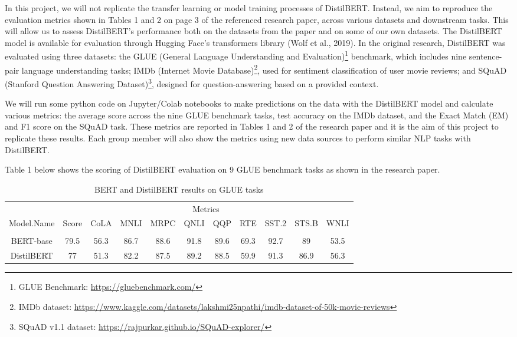 \documentclass[
  11pt,
]{article}
\begin{document}
In this project, we will not replicate the transfer learning or model
training processes of DistilBERT. Instead, we aim to reproduce the
evaluation metrics shown in Tables 1 and 2 on page 3 of the referenced
research paper, across various datasets and downstream tasks. This will
allow us to assess DistilBERT's performance both on the datasets from
the paper and on some of our own datasets. The DistilBERT model is
available for evaluation through Hugging Face's transformers library
(Wolf et al., 2019). In the original research, DistilBERT was evaluated
using three datasets: the GLUE (General Language Understanding and
Evaluation)\footnote{GLUE Benchmark: \url{https://gluebenchmark.com/}}
benchmark, which includes nine sentence-pair language understanding
tasks; IMDb (Internet Movie Database)\footnote{IMDb dataset:
  \url{https://www.kaggle.com/datasets/lakshmi25npathi/imdb-dataset-of-50k-movie-reviews}},
used for sentiment classification of user movie reviews; and SQuAD
(Stanford Question Answering Dataset)\footnote{SQuAD v1.1 dataset:
  \url{https://rajpurkar.github.io/SQuAD-explorer/}}, designed for
question-answering based on a provided context.

We will run some python code on Jupyter/Colab notebooks to make
predictions on the data with the DistilBERT model and calculate various
metrics: the average score across the nine GLUE benchmark tasks, test
accuracy on the IMDb dataset, and the Exact Match (EM) and F1 score on
the SQuAD task. These metrics are reported in Tables 1 and 2 of the
research paper and it is the aim of this project to replicate these
results. Each group member will also show the metrics using new data
sources to perform similar NLP tasks with DistilBERT.

Table 1 below shows the scoring of DistilBERT evaluation on 9 GLUE
benchmark tasks as shown in the research paper.

\begin{longtable}[t]{ccccccccccc}
\caption{\label{tab:table1}BERT and DistilBERT results on GLUE tasks}\\
\toprule
\multicolumn{1}{c}{ } & \multicolumn{10}{c}{Metrics} \\
\cmidrule(l{3pt}r{3pt}){2-11}
Model.Name & Score & CoLA & MNLI & MRPC & QNLI & QQP & RTE & SST.2 & STS.B & WNLI\\
\midrule
 &  &  &  &  &  &  &  &  &  & \\
BERT-base & 79.5 & 56.3 & 86.7 & 88.6 & 91.8 & 89.6 & 69.3 & 92.7 & 89 & 53.5\\
DistilBERT & 77 & 51.3 & 82.2 & 87.5 & 89.2 & 88.5 & 59.9 & 91.3 & 86.9 & 56.3\\
\bottomrule
\end{longtable}
\end{document}
